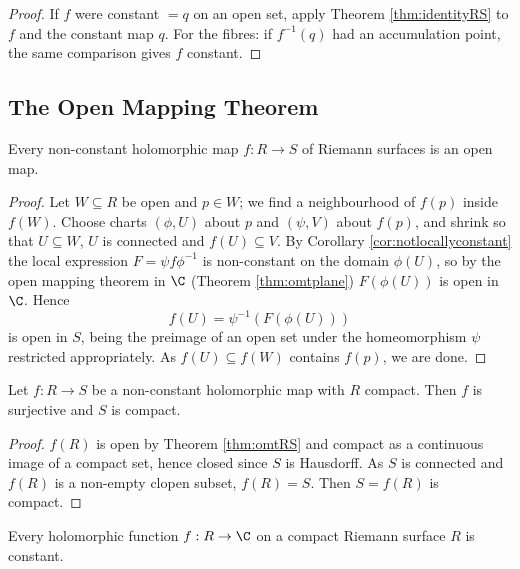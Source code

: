 \begin{proof}
	If $f$ were constant $= q$ on an open set, apply Theorem \ref{thm:identityRS} to $f$ and
	the constant map $q$. For the fibres: if $f^{-1}(q)$ had an accumulation point, the same
	comparison gives $f$ constant.
\end{proof}

\subsection{The Open Mapping Theorem}

\begin{theorem}\label{thm:omtRS}
	Every non-constant holomorphic map $f : R \to S$ of Riemann surfaces is an open map.
\end{theorem}

\begin{proof}
	Let $W \subseteq R$ be open and $p \in W$; we find a neighbourhood of $f(p)$ inside
	$f(W)$. Choose charts $(\phi, U)$ about $p$ and $(\psi, V)$ about $f(p)$, and shrink so
	that $U \subseteq W$, $U$ is connected and $f(U) \subseteq V$. By Corollary
	\ref{cor:notlocallyconstant} the local expression $F = \psi f \phi^{-1}$ is non-constant
	on the domain $\phi(U)$, so by the open mapping theorem in $\C$ (Theorem
	\ref{thm:omtplane}) $F(\phi(U))$ is open in $\C$. Hence
	$$
	f(U) = \psi^{-1}\left(F(\phi(U))\right)
	$$
	is open in $S$, being the preimage of an open set under the homeomorphism $\psi$
	restricted appropriately. As $f(U) \subseteq f(W)$ contains $f(p)$, we are done.
\end{proof}

\begin{corollary}\label{cor:compactsurjective}
	Let $f : R \to S$ be a non-constant holomorphic map with $R$ compact. Then $f$ is
	surjective and $S$ is compact.
\end{corollary}

\begin{proof}
	$f(R)$ is open by Theorem \ref{thm:omtRS} and compact as a continuous image of a
	compact set, hence closed since $S$ is Hausdorff. As $S$ is connected and $f(R)$ is a
	non-empty clopen subset, $f(R) = S$. Then $S = f(R)$ is compact.
\end{proof}

\begin{corollary}\label{cor:noholofnsoncompact}
	Every holomorphic function $f : R \to \C$ on a compact Riemann surface $R$ is constant.
\end{corollary}

